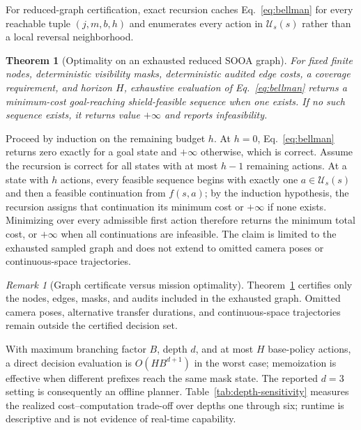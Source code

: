 \documentclass{IEEEtaes}
\newtheorem{theorem}{Theorem}
\theoremstyle{remark}
\newtheorem{remark}{Remark}
\theoremstyle{plain}
\begin{document}
For reduced-graph certification, exact recursion caches Eq.~\eqref{eq:bellman} for every reachable tuple $(j,m,b,h)$ and enumerates every action in $\mathcal U_s(s)$ rather than a local reversal neighborhood.

\begin{theorem}[Optimality on an exhausted reduced SOOA graph]
\label{thm:reduced-optimality}
For fixed finite nodes, deterministic visibility masks, deterministic audited edge costs, a coverage requirement, and horizon $H$, exhaustive evaluation of Eq.~\eqref{eq:bellman} returns a minimum-cost goal-reaching shield-feasible sequence when one exists. If no such sequence exists, it returns value $+\infty$ and reports infeasibility.
\end{theorem}

\begin{IEEEproof}
Proceed by induction on the remaining budget $h$. At $h=0$, Eq.~\eqref{eq:bellman} returns zero exactly for a goal state and $+\infty$ otherwise, which is correct. Assume the recursion is correct for all states with at most $h-1$ remaining actions. At a state with $h$ actions, every feasible sequence begins with exactly one $a\in\mathcal U_s(s)$ and then a feasible continuation from $f(s,a)$; by the induction hypothesis, the recursion assigns that continuation its minimum cost or $+\infty$ if none exists. Minimizing over every admissible first action therefore returns the minimum total cost, or $+\infty$ when all continuations are infeasible. The claim is limited to the exhausted sampled graph and does not extend to omitted camera poses or continuous-space trajectories.
\end{IEEEproof}

\begin{remark}[Graph certificate versus mission optimality]
Theorem~\ref{thm:reduced-optimality} certifies only the nodes, edges, masks, and audits included in the exhausted graph. Omitted camera poses, alternative transfer durations, and continuous-space trajectories remain outside the certified decision set.
\end{remark}

With maximum branching factor $B$, depth $d$, and at most $H$ base-policy actions, a direct decision evaluation is $O(HB^{d+1})$ in the worst case; memoization is effective when different prefixes reach the same mask state. The reported $d=3$ setting is consequently an offline planner. Table~\ref{tab:depth-sensitivity} measures the realized cost--computation trade-off over depths one through six; runtime is descriptive and is not evidence of real-time capability.
\end{document}
